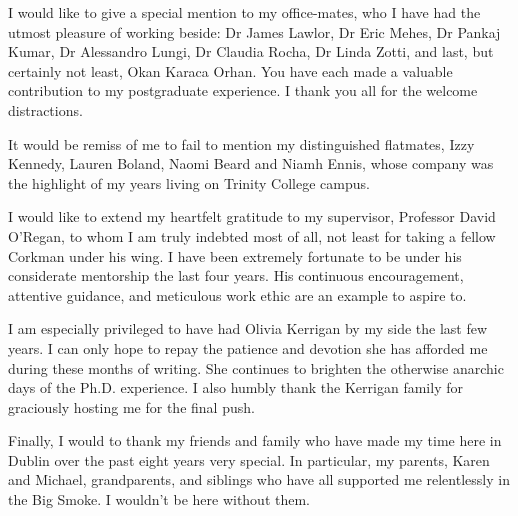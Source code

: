 I would like to give a special 
mention to my office-mates, 
who I have had the 
utmost pleasure of working beside:
Dr James Lawlor, Dr Eric Mehes, 
Dr Pankaj Kumar, Dr Alessandro Lungi, 
Dr Claudia Rocha, Dr Linda Zotti, 
and last, but certainly not least, 
Okan Karaca Orhan.
%
You have each made a valuable 
contribution to my postgraduate experience.
%
I thank you all for the welcome distractions.


It would be remiss of me to fail to mention 
my distinguished flatmates, 
Izzy Kennedy, Lauren Boland, 
Naomi Beard and Niamh Ennis,
whose company was the 
highlight of my years living on 
Trinity College campus.
%


I would like to extend my heartfelt gratitude 
to my supervisor, Professor David O'Regan, 
to whom I am truly indebted most of all, 
not least for taking a fellow Corkman under his wing.
%
I have been extremely fortunate 
to be under his considerate mentorship 
the last four years.
%
His continuous encouragement, 
attentive guidance, 
and meticulous work ethic 
are an example to aspire to.


I am especially privileged 
to have had Olivia Kerrigan 
by my side the last few years.
%
I can only hope to repay 
the patience and devotion 
she has afforded me during 
these months of writing.
%
She continues to brighten  
the otherwise anarchic days 
of the Ph.D. experience. 
%
I also humbly thank 
the Kerrigan family for 
graciously hosting me 
for the final push.

Finally, 
I would to thank my friends and family 
who have made my time here in Dublin 
over the past eight years very special.
%
In particular, 
my parents, Karen and Michael, 
grandparents, and siblings 
who have all supported me relentlessly  
in the Big Smoke. 
%
I wouldn't be here without them.





